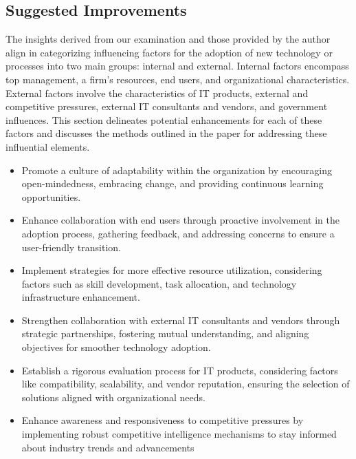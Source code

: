 \documentclass{article}
\begin{document}
\subsection{Suggested Improvements}

The insights derived from our examination and those provided by the author \cite{reference11} align in categorizing influencing factors for the adoption of new technology or processes into two main groups: internal and external. Internal factors encompass top management, a firm's resources, end users, and organizational characteristics. External factors involve the characteristics of IT products, external and competitive pressures, external IT consultants and vendors, and government influences. This section delineates potential enhancements for each of these factors and discusses the methods outlined in the paper for addressing these influential elements.

\begin{itemize}
  \item Promote a culture of adaptability within the organization by encouraging open-mindedness, embracing change, and providing continuous learning opportunities.

  \item Enhance collaboration with end users through proactive involvement in the adoption process, gathering feedback, and addressing concerns to ensure a user-friendly transition.

  \item Implement strategies for more effective resource utilization, considering factors such as skill development, task allocation, and technology infrastructure enhancement.

  \item Strengthen collaboration with external IT consultants and vendors through strategic partnerships, fostering mutual understanding, and aligning objectives for smoother technology adoption.

  \item Establish a rigorous evaluation process for IT products, considering factors like compatibility, scalability, and vendor reputation, ensuring the selection of solutions aligned with organizational needs.

  \item Enhance awareness and responsiveness to competitive pressures by implementing robust competitive intelligence mechanisms to stay informed about industry trends and advancements

\end{itemize}
\end{document}
